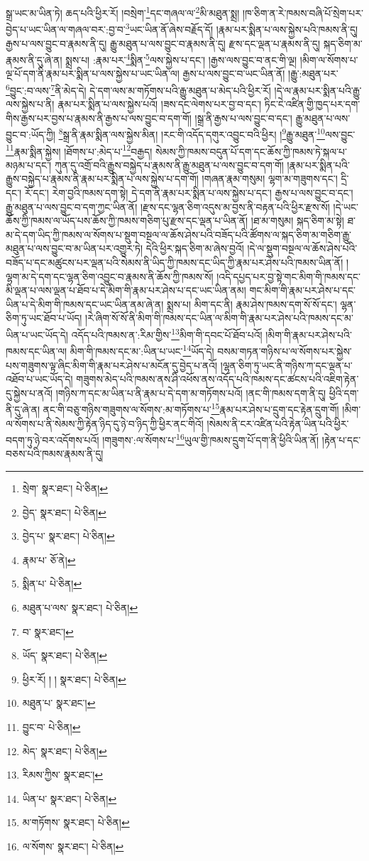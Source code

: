 སྒྲ་ཡང་མ་ཡིན་ཏེ། ཆད་པའི་ཕྱིར་རོ། །བསྲེག་\footnote{སྲེག་  སྣར་ཐང་།  པེ་ཅིན། }དང་གཞལ་ལ་\footnote{བྱེད་  སྣར་ཐང་།  པེ་ཅིན། }མི་མཐུན་སྨྲ། །ཁ་ཅིག་ན་རེ་ཁམས་བཞི་པོ་སྲེག་པར་བྱེད་པ་ཡང་ཡིན་ལ་གཞལ་བར་:བྱ་བ་\footnote{བྱེད་པ་  སྣར་ཐང་།  པེ་ཅིན། }ཡང་ཡིན་ནོ་ཞེས་བརྗོད་དོ། །རྣམ་པར་སྨིན་པ་ལས་སྐྱེས་པའི་ཁམས་ནི་དུ། རྒྱས་པ་ལས་བྱུང་བ་རྣམས་ནི་དུ། རྒྱུ་མཐུན་པ་ལས་བྱུང་བ་རྣམས་ནི་དུ། རྫས་དང་ལྡན་པ་རྣམས་ནི་དུ། སྐད་ཅིག་མ་རྣམས་ནི་དུ་ཞེ་ན། སྨྲས་པ། :རྣམ་པར་\footnote{རྣམ་པ་  ཅོ་ནེ། }སྨིན་\footnote{སྨིན་པ་  པེ་ཅིན། }ལས་སྐྱེས་པ་དང་། །རྒྱས་ལས་བྱུང་བ་ནང་གི་ལྔ། །མིག་ལ་སོགས་པ་ལྔ་པོ་དག་ནི་རྣམ་པར་སྨིན་པ་ལས་སྐྱེས་པ་ཡང་ཡིན་ལ། རྒྱས་པ་ལས་བྱུང་བ་ཡང་ཡིན་ནོ། །རྒྱུ་:མཐུན་པར་\footnote{མཐུན་པ་ལས་  སྣར་ཐང་།  པེ་ཅིན། }བྱུང་:བ་ལས་\footnote{བ་  སྣར་ཐང་། }ནི་མེད་དེ། དེ་དག་ལས་མ་གཏོགས་པའི་རྒྱུ་མཐུན་པ་མེད་པའི་ཕྱིར་རོ། །དེ་ལ་རྣམ་པར་སྨིན་པའི་རྒྱུ་ལས་སྐྱེས་པ་ནི། རྣམ་པར་སྨིན་པ་ལས་སྐྱེས་པའོ། །ཟས་དང་ལེགས་པར་བྱ་བ་དང་། ཏིང་ངེ་འཛིན་གྱི་ཁྱད་པར་དག་གིས་རྒྱས་པར་བྱས་པ་རྣམས་ནི་རྒྱས་པ་ལས་བྱུང་བ་དག་གོ། །སྒྲ་ནི་རྒྱས་པ་ལས་བྱུང་བ་དང་། རྒྱུ་མཐུན་པ་ལས་བྱུང་བ་:ཡོད་ཀྱི། \footnote{ཡོད་  སྣར་ཐང་།  པེ་ཅིན། }སྒྲ་ནི་རྣམ་སྨིན་ལས་སྐྱེས་མིན། །རང་གི་འདོད་དགུར་འབྱུང་བའི་ཕྱིར། །\footnote{ཕྱིར་རོ། ། །  སྣར་ཐང་།  པེ་ཅིན། }རྒྱུ་མཐུན་\footnote{མཐུན་པ་  སྣར་ཐང་། }ལས་བྱུང་\footnote{བྱུང་བ་  པེ་ཅིན། }རྣམ་སྨིན་སྐྱེས། །ཐོགས་པ་:མེད་པ་\footnote{མེད་  སྣར་ཐང་།  པེ་ཅིན། }བརྒྱད། སེམས་ཀྱི་ཁམས་བདུན་པོ་དག་དང་ཆོས་ཀྱི་ཁམས་ཏེ་སྐལ་པ་མཉམ་པ་དང་། ཀུན་དུ་འགྲོ་བའི་རྒྱུས་བསྐྱེད་པ་རྣམས་ནི་རྒྱུ་མཐུན་པ་ལས་བྱུང་བ་དག་གོ། །རྣམ་པར་སྨིན་པའི་རྒྱུས་བསྐྱེད་པ་རྣམས་ནི་རྣམ་པར་སྨིན་པ་ལས་སྐྱེས་པ་དག་གོ། །གཞན་རྣམ་གསུམ། ལྷག་མ་གཟུགས་དང་། དྲི་དང་། རོ་དང་། རེག་བྱའི་ཁམས་དག་སྟེ། དེ་དག་ནི་རྣམ་པར་སྨིན་པ་ལས་སྐྱེས་པ་དང་། རྒྱས་པ་ལས་བྱུང་བ་དང་། རྒྱུ་མཐུན་པ་ལས་བྱུང་བ་དག་ཀྱང་ཡིན་ནོ། །རྫས་དང་ལྷན་ཅིག་འདུས་མ་བྱས་ནི་བརྟན་པའི་ཕྱིར་རྫས་སོ། །དེ་ཡང་ཆོས་ཀྱི་ཁམས་ལ་ཡོད་པས་ཆོས་ཀྱི་ཁམས་གཅིག་པུ་རྫས་དང་ལྡན་པ་ཡིན་ནོ། །ཐ་མ་གསུམ། སྐད་ཅིག་མ་སྟེ། ཐ་མ་དེ་དག་ཡིད་ཀྱི་ཁམས་ལ་སོགས་པ་སྡུག་བསྔལ་ལ་ཆོས་ཤེས་པའི་བཟོད་པའི་ཚོགས་ལ་སྐད་ཅིག་མ་གཅིག་རྒྱུ་མཐུན་པ་ལས་བྱུང་བ་མ་ཡིན་པར་འགྱུར་ཏེ། དེའི་ཕྱིར་སྐད་ཅིག་མ་ཞེས་བྱའོ། །དེ་ལ་སྡུག་བསྔལ་ལ་ཆོས་ཤེས་པའི་བཟོད་པ་དང་མཚུངས་པར་ལྡན་པའི་སེམས་ནི་ཡིད་ཀྱི་ཁམས་དང་ཡིད་ཀྱི་རྣམ་པར་ཤེས་པའི་ཁམས་ཡིན་ནོ། །ལྷག་མ་དེ་དག་དང་ལྷན་ཅིག་འབྱུང་བ་རྣམས་ནི་ཆོས་ཀྱི་ཁམས་སོ། །འདི་དཔྱད་པར་བྱ་སྟེ་གང་མིག་གི་ཁམས་དང་མི་ལྡན་པ་ལས་ལྡན་པ་ཐོབ་པ་དེ་མིག་གི་རྣམ་པར་ཤེས་པ་དང་ཡང་ཡིན་ནམ། གང་མིག་གི་རྣམ་པར་ཤེས་པ་དང་ཡིན་པ་དེ་མིག་གི་ཁམས་དང་ཡང་ཡིན་ནམ་ཞེ་ན། སྨྲས་པ། མིག་དང་ནི། རྣམ་ཤེས་ཁམས་དག་སོ་སོ་དང་། ལྷན་ཅིག་ཏུ་ཡང་ཐོབ་པ་ཡོད། །རེ་ཞིག་སོ་སོ་ནི་མིག་གི་ཁམས་དང་ཡིན་ལ་མིག་གི་རྣམ་པར་ཤེས་པའི་ཁམས་དང་མ་ཡིན་པ་ཡང་ཡོད་དེ། འདོད་པའི་ཁམས་ན་:རིམ་གྱིས་\footnote{རིམས་ཀྱིས་  སྣར་ཐང་། }མིག་གི་དབང་པོ་ཐོབ་པའོ། །མིག་གི་རྣམ་པར་ཤེས་པའི་ཁམས་དང་ཡིན་ལ། མིག་གི་ཁམས་དང་མ་:ཡིན་པ་ཡང་\footnote{ཡིན་པ་  སྣར་ཐང་།  པེ་ཅིན། }ཡོད་དེ། བསམ་གཏན་གཉིས་པ་ལ་སོགས་པར་སྐྱེས་པས་གཟུགས་ལྟ་ཞིང་མིག་གི་རྣམ་པར་ཤེས་པ་མངོན་དུ་བྱེད་པ་ནའོ། །ལྷན་ཅིག་ཏུ་ཡང་ནི་གཉིས་ཀ་དང་ལྡན་པ་འཐོབ་པ་ཡང་ཡོད་དེ། གཟུགས་མེད་པའི་ཁམས་ནས་ཤི་འཕོས་ནས་འདོད་པའི་ཁམས་དང་ཚངས་པའི་འཇིག་རྟེན་དུ་སྐྱེས་པ་ནའོ། །གཉིས་ཀ་དང་མ་ཡིན་པ་ནི་རྣམ་པ་དེ་དག་མ་གཏོགས་པའོ། །ནང་གི་ཁམས་དག་ནི་དུ། ཕྱིའི་དག་ནི་དུ་ཞེ་ན། ནང་གི་བཅུ་གཉིས་གཟུགས་ལ་སོགས་:མ་གཏོགས་པ་\footnote{མ་གཏོགས་  སྣར་ཐང་།  པེ་ཅིན། }རྣམ་པར་ཤེས་པ་དྲུག་དང་རྟེན་དྲུག་གོ། །མིག་ལ་སོགས་པ་ནི་སེམས་ཀྱི་རྟེན་ཉིད་དུ་ཉེ་བ་ཉིད་ཀྱི་ཕྱིར་ནང་གིའོ། །སེམས་ནི་ངར་འཛིན་པའི་རྟེན་ཡིན་པའི་ཕྱིར་བདག་ཏུ་ཉེ་བར་འདོགས་པའོ། །གཟུགས་:ལ་སོགས་པ་\footnote{ལ་སོགས་  སྣར་ཐང་།  པེ་ཅིན། }ཡུལ་གྱི་ཁམས་དྲུག་པོ་དག་ནི་ཕྱིའི་ཡིན་ནོ། །རྟེན་པ་དང་བཅས་པའི་ཁམས་རྣམས་ནི་དུ། 